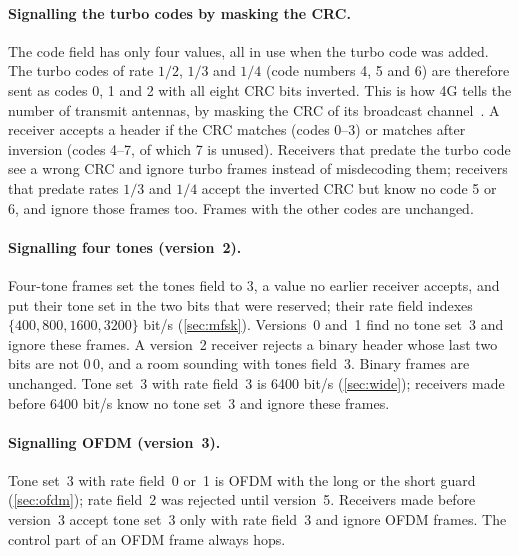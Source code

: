 \documentclass[11pt,a4paper]{article}
\theoremstyle{remark}
\begin{document}
\paragraph{Signalling the turbo codes by masking the CRC.}
The code field has only four values, all in use when the turbo code was added. The turbo codes of rate $1/2$, $1/3$ and $1/4$ (code numbers 4, 5 and 6) are therefore sent as codes 0, 1 and 2 with all eight CRC bits inverted. This is how 4G tells the number of transmit antennas, by masking the CRC of its broadcast channel~\cite{ts36212}. A receiver accepts a header if the CRC matches (codes 0--3) or matches after inversion (codes 4--7, of which 7 is unused). Receivers that predate the turbo code see a wrong CRC and ignore turbo frames instead of misdecoding them; receivers that predate rates $1/3$ and $1/4$ accept the inverted CRC but know no code 5 or 6, and ignore those frames too. Frames with the other codes are unchanged.

\paragraph{Signalling four tones (version~2).}
Four-tone frames set the tones field to 3, a value no earlier receiver accepts, and put their tone set in the two bits that were reserved; their rate field indexes $\{400, 800, 1600, 3200\}$ bit/s (\cref{sec:mfsk}). Versions~0 and~1 find no tone set~3 and ignore these frames. A version~2 receiver rejects a binary header whose last two bits are not $0\,0$, and a room sounding with tones field~3. Binary frames are unchanged. Tone set~3 with rate field~3 is 6400 bit/s (\cref{sec:wide}); receivers made before 6400 bit/s know no tone set~3 and ignore these frames.

\paragraph{Signalling OFDM (version~3).}
Tone set~3 with rate field~0 or~1 is OFDM with the long or the short guard (\cref{sec:ofdm}); rate field~2 was rejected until version~5. Receivers made before version~3 accept tone set~3 only with rate field~3 and ignore OFDM frames. The control part of an OFDM frame always hops.
\end{document}
